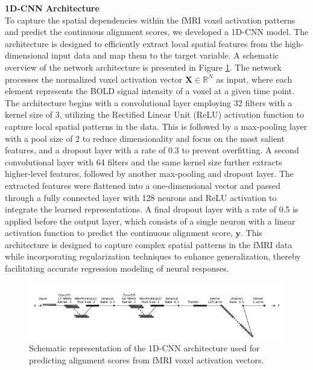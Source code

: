 \documentclass[a4paper]{article}
\begin{document}
\noindent \textbf{1D-CNN Architecture}\\
To capture the spatial dependencies within the fMRI voxel activation patterns and predict the continuous alignment scores, we developed a 1D-CNN model. The architecture is designed to efficiently extract local spatial features from the high-dimensional input data and map them to the target variable. A schematic overview of the network architecture is presented in Figure \ref{fig:1dCNNarch}. The network processes the normalized voxel activation vector \(\mathbf{X} \in \mathbb{R}^{N}\) as input, where each element represents the BOLD signal intensity of a voxel at a given time point. The architecture begins with a convolutional layer employing 32 filters with a kernel size of 3, utilizing the Rectified Linear Unit (ReLU) activation function to capture local spatial patterns in the data. This is followed by a max-pooling layer with a pool size of 2 to reduce dimensionality and focus on the most salient features, and a dropout layer with a rate of 0.3 to prevent overfitting. A second convolutional layer with 64 filters and the same kernel size further extracts higher-level features, followed by another max-pooling and dropout layer. The extracted features were flattened into a one-dimensional vector and passed through a fully connected layer with 128 neurons and ReLU activation to integrate the learned representations. A final dropout layer with a rate of 0.5 is applied before the output layer, which consists of a single neuron with a linear activation function to predict the continuous alignment score, \(\mathbf{y}\). This architecture is designed to capture complex spatial patterns in the fMRI data while incorporating regularization techniques to enhance generalization, thereby facilitating accurate regression modeling of neural responses.\\

\begin{figure}
    \centering
    \includegraphics[width=1\linewidth]{CNNArch2.png}
    \caption{Schematic representation of the 1D-CNN architecture used for predicting alignment scores from fMRI voxel activation vectors.}
    \label{fig:1dCNNarch}
\end{figure}
\end{document}
